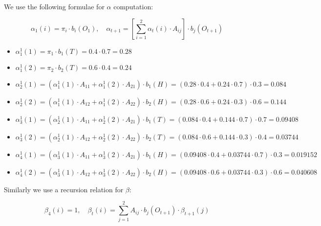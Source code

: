 \documentclass[11pt,a4paper]{article}
\begin{document}
	We use the following formulae for $\alpha$ computation:
	
	$$ \alpha_1(i) = \pi_i \cdot b_i(O_1), \quad \alpha_{t+1} = \left[ \sum_{i=1}^2 \alpha_t(i) \cdot A_{ij} \right] \cdot b_j (O_{t+1})$$
	
	
	\begin{itemize}
	\item $\alpha_1^1(1) = \pi_1 \cdot b_1(T) = 0.4 \cdot 0.7 = 0.28$
	\item $\alpha_1^1(2) = \pi_2 \cdot b_2(T) = 0.6 \cdot 0.4 = 0.24$
	\item $\alpha_2^1(1) = (\alpha_1^1(1) \cdot A_{11} + \alpha_1^1(2) \cdot A_{21}) \cdot b_1(H) = (0.28 \cdot 0.4 + 0.24 \cdot 0.7) \cdot 0.3 = 0.084$
	\item $\alpha_2^1(2) = (\alpha_1^1(1) \cdot A_{12} + \alpha_1^1(2) \cdot A_{22}) \cdot b_2(H) = (0.28 \cdot 0.6 + 0.24 \cdot 0.3) \cdot 0.6 = 0.144$
	\item $\alpha_3^1(1) = (\alpha_2^1(1) \cdot A_{11} + \alpha_2^1(2) \cdot A_{21}) \cdot b_1(T) = (0.084 \cdot 0.4 + 0.144 \cdot 0.7) \cdot 0.7 = 0.09408$
	\item $\alpha_3^1(2) = (\alpha_2^1(1) \cdot A_{12} + \alpha_2^1(2) \cdot A_{22}) \cdot b_2(T) = (0.084 \cdot 0.6 + 0.144 \cdot 0.3) \cdot 0.4 = 0.03744$
	\item $\alpha_4^1(1) = (\alpha_3^1(1) \cdot A_{11} + \alpha_3^1(2) \cdot A_{21}) \cdot b_1(H) = (0.09408 \cdot 0.4 + 0.03744 \cdot 0.7) \cdot 0.3 = 0.019152$	
	\item $\alpha_4^1(2) = (\alpha_3^1(1) \cdot A_{12} + \alpha_3^1(2) \cdot A_{22}) \cdot b_2(H) = (0.09408 \cdot 0.6 + 0.03744 \cdot 0.3) \cdot 0.6 = 0.040608$
	
	\end{itemize}
	
	Similarly we use a recursion relation for $\beta$:
	
	$$ \beta_4(i) = 1, \quad \beta_t(i) = \sum_{j = 1}^2 A_{ij} \cdot b_j(O_{t + 1}) \cdot \beta_{t + 1}(j)$$
	
\end{document}
